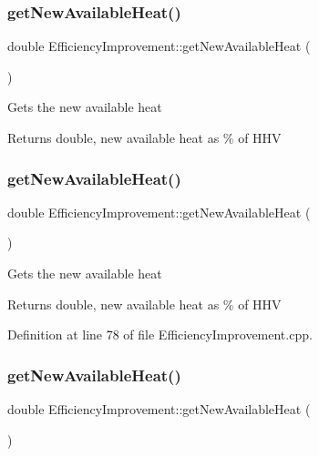 \subsubsection{\texorpdfstring{get\+New\+Available\+Heat()}{getNewAvailableHeat()}\hspace{0.1cm}{\footnotesize\ttfamily [1/3]}}
{\footnotesize\ttfamily double Efficiency\+Improvement\+::get\+New\+Available\+Heat (\begin{DoxyParamCaption}{ }\end{DoxyParamCaption})}

Gets the new available heat

\begin{DoxyReturn}{Returns}
double, new available heat as \% of H\+HV 
\end{DoxyReturn}
\mbox{\label{class_efficiency_improvement_a37df0eb5d1dc43627e947a610f2a9c08}} 
\subsubsection{\texorpdfstring{get\+New\+Available\+Heat()}{getNewAvailableHeat()}\hspace{0.1cm}{\footnotesize\ttfamily [2/3]}}
{\footnotesize\ttfamily double Efficiency\+Improvement\+::get\+New\+Available\+Heat (\begin{DoxyParamCaption}{ }\end{DoxyParamCaption})}

Gets the new available heat

\begin{DoxyReturn}{Returns}
double, new available heat as \% of H\+HV 
\end{DoxyReturn}


Definition at line 78 of file Efficiency\+Improvement.\+cpp.

\mbox{\label{class_efficiency_improvement_a37df0eb5d1dc43627e947a610f2a9c08}} 
\subsubsection{\texorpdfstring{get\+New\+Available\+Heat()}{getNewAvailableHeat()}\hspace{0.1cm}{\footnotesize\ttfamily [3/3]}}
{\footnotesize\ttfamily double Efficiency\+Improvement\+::get\+New\+Available\+Heat (\begin{DoxyParamCaption}{ }\end{DoxyParamCaption})}

